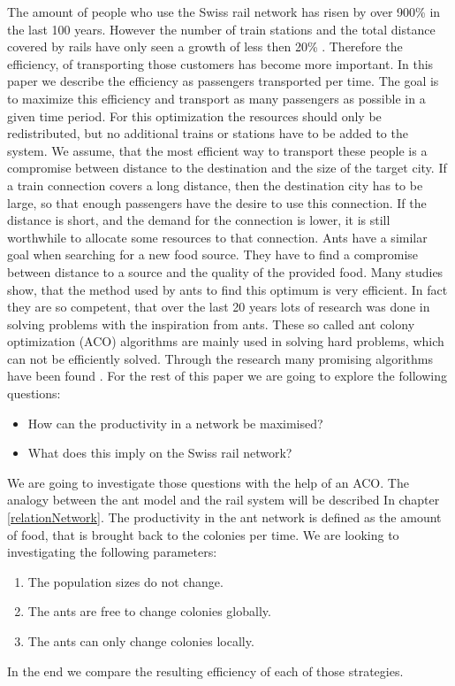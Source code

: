 The amount of people who use the Swiss rail network has risen by over 900\% in the last 100 years. However the number of train stations and the total distance covered by rails have only seen a growth of less then 20\% \citep{SbbStats}. Therefore the efficiency, of transporting those customers has become more important. In this paper we describe the efficiency as passengers transported per time. The goal is to maximize this efficiency and transport as many passengers as possible in a given time period. For this optimization the resources should only be redistributed, but no additional trains or stations have to be added to the system. 
We assume, that the most efficient way to transport these people is a compromise between distance to the destination and the size of the target city. If a train connection covers a long distance, then the destination city has to be large, so that enough passengers have the desire to use this connection. If the distance is short, and the demand for the connection is lower, it is still worthwhile to allocate some resources to that connection.
Ants have a similar goal when searching for a new food source. They have to find a compromise between distance to a source and the quality of the provided food. Many studies show, that the method used by ants to find this optimum is very efficient. In fact they are so competent, that over the last 20 years lots of research was done in solving problems with the inspiration from ants. These so called ant colony optimization (ACO) algorithms are mainly used in solving hard problems, which can not be efficiently solved. Through the research many promising algorithms have been found \citep{Aco1}.
For the rest of this paper we are going to explore the following questions:
\begin{itemize}
  \item How can the productivity in a network be maximised?
  \item What does this imply on the Swiss rail network?
\end{itemize}
We are going to investigate those questions with the help of an ACO. The analogy between the ant model and the rail system will be described In chapter \ref{relationNetwork}. The productivity in the ant network is defined as the amount of food, that is brought back to the colonies per time. We are looking to investigating the following parameters:
\begin{enumerate}
	\item The population sizes do not change.
	\item The ants are free to change colonies globally.
	\item The ants can only change colonies locally.
\end{enumerate}
In the end we compare the resulting efficiency of each of those strategies. 
